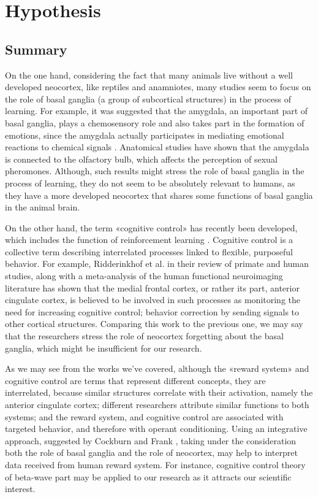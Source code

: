 \documentclass[14pt,a4paper]{scrartcl}
\begin{document}
\newpage
\section{Hypothesis}
\label{sec:Hypothesis}

\subsection{Summary}
\label{sec:Hypothesis:Summary}

On the one hand, considering the fact that many animals live without a well developed neocortex, like reptiles and anamniotes, many studies seem to focus on the role of basal ganglia (a group of subcortical structures) in the process of learning. For example, it was suggested that the amygdala, an important part of basal ganglia, plays a chemosensory role and also takes part in the formation of emotions, since the amygdala actually participates in mediating emotional reactions to chemical signals \cite{Martinez-Garcia2010}. Anatomical studies have shown that the amygdala is connected to the olfactory bulb, which affects the perception of sexual pheromones. Although, such results might stress the role of basal ganglia in the process of learning, they do not seem to be absolutely relevant to humans, as they have a more developed neocortex that shares some functions of basal ganglia in the animal brain.

On the other hand, the term «cognitive control» has recently been developed, which includes the function of reinforcement learning \cite{Cockburn2011}. Cognitive control is a collective term describing interrelated processes linked to flexible, purposeful behavior. For example, Ridderinkhof et al. \cite{Ridderinkhof2004} in their review of primate and human studies, along with a meta-analysis of the human functional neuroimaging literature has shown that the medial frontal cortex, or rather its part, anterior cingulate cortex, is believed to be involved in such processes as monitoring the need for increasing cognitive control; behavior correction by sending signals to other cortical structures. Comparing this work to the previous one, we may say that the researchers stress the role of neocortex forgetting about the basal ganglia, which might be insufficient for our research.

As we may see from the works we’ve covered, although the «reward system» and cognitive control are terms that represent different concepts, they are interrelated, because similar structures correlate with their activation, namely the anterior cingulate cortex; different researchers attribute similar functions to both systems; and the reward system, and cognitive control are associated with targeted behavior, and therefore with operant conditioning. Using an integrative approach, suggested by Cockburn and Frank \cite{Cockburn2011}, taking under the consideration both the role of basal ganglia and the role of neocortex, may help to interpret data received from human reward system. For instance, cognitive control theory of beta-wave part may be applied to our research as it attracts our scientific interest.
\end{document}
